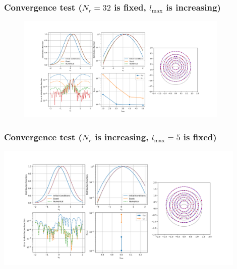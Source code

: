 \documentclass[mathserif, aspectratio=169]{beamer}
\newcommand{\vect}[1]{\boldsymbol{#1}}
\newcommand{\of}[1]{\mleft( #1 \mright)}
\begin{document}
\begin{frame}
\frametitle{\small Convergence test ($N_r = 32$ is fixed, $l_{\max}$ is increasing)}
\begin{figure}
\includegraphics[width=0.9\textwidth]{figures/splines/nr_32_to_32_lmax_2_to_5.png}
\end{figure}
\end{frame}

\begin{frame}
\frametitle{\small Convergence test ($N_r$ is increasing, $l_{\max} = 5$ is fixed)}
\begin{center}
\includegraphics[width=0.9\textwidth]{figures/splines/nr_16_to_64_lmax_5_to_5.png}
\end{center}
\end{frame}
\end{document}
